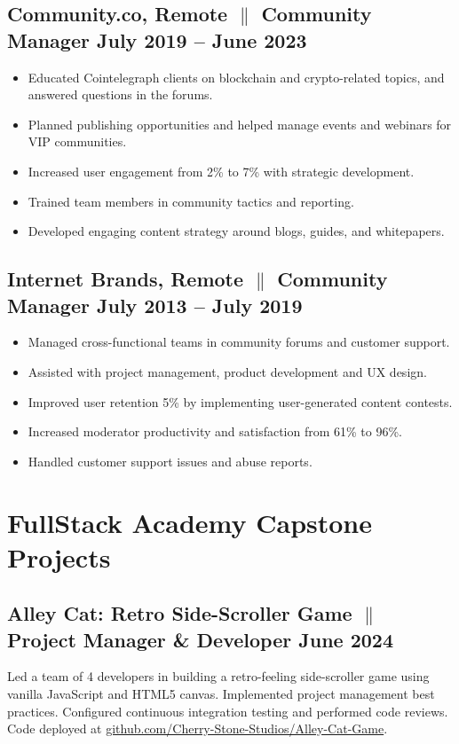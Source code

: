 \documentclass[a4paper,9pt]{article}
\begin{document}
\subsection{Community.co, Remote {$\parallel$}{ Community Manager} \hfill
      \textbf{July 2019 – June
            2023}}
\begin{itemize}
      \item Educated Cointelegraph clients on blockchain and crypto-related topics, and answered questions in the forums.
      \item Planned publishing opportunities and helped manage
      events and webinars for VIP communities.
      \item Increased user engagement from 2\% to 7\% with strategic development.
      \item Trained team members in community tactics and reporting.
      \item Developed engaging content strategy around blogs, guides, and whitepapers.
\end{itemize}

\subsection{Internet Brands, Remote {$\parallel$}{ Community Manager} \hfill
      \textbf{July 2013 – July
            2019}}
\begin{itemize}
      \item Managed cross-functional teams in community forums and customer
      support.
      \item Assisted with project management, product development and UX design.
      \item Improved user retention 5\% by implementing user-generated content contests.
      \item Increased moderator productivity and satisfaction from 61\%
            to
            96\%.
      \item Handled customer support issues and abuse reports.
\end{itemize}

\section{FullStack Academy Capstone Projects}

\subsection{Alley Cat: Retro Side-Scroller Game {$\parallel$}{
                  Project Manager
                  \& Developer}
      \hfill \textbf{June 2024}}
{ Led a team of 4 developers in building a retro-feeling
      side-scroller game using vanilla JavaScript and HTML5 canvas.
      Implemented
      project management best practices. Configured continuous integration testing and
      performed
      code reviews. Code deployed at \href{https://github.com/Cherry-Stone-Studios/Alley-Cat-Game}{github.com/Cherry-Stone-Studios/Alley-Cat-Game}.}
\end{document}
